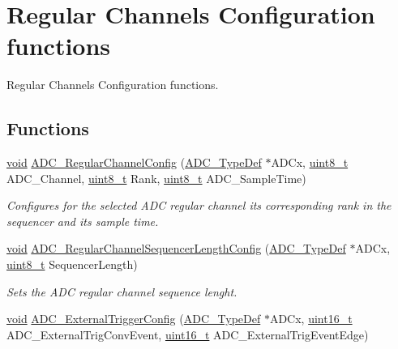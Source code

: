 \hypertarget{group___a_d_c___group4}{\section{Regular Channels Configuration functions}
\label{group___a_d_c___group4}
}


Regular Channels Configuration functions.  


\subsection*{Functions}
\begin{DoxyCompactItemize}
\item 
\hyperlink{group___n_a_m_e_ga18028b8badbf1ea7e704ccac3c488e82}{void} \hyperlink{group___a_d_c___group4_gac531adb577b648d4bb8881f2ed627d52}{A\-D\-C\-\_\-\-Regular\-Channel\-Config} (\hyperlink{struct_a_d_c___type_def}{A\-D\-C\-\_\-\-Type\-Def} $\ast$A\-D\-Cx, \hyperlink{stdint_8h_aba7bc1797add20fe3efdf37ced1182c5}{uint8\-\_\-t} A\-D\-C\-\_\-\-Channel, \hyperlink{stdint_8h_aba7bc1797add20fe3efdf37ced1182c5}{uint8\-\_\-t} Rank, \hyperlink{stdint_8h_aba7bc1797add20fe3efdf37ced1182c5}{uint8\-\_\-t} A\-D\-C\-\_\-\-Sample\-Time)
\begin{DoxyCompactList}\small\item\em Configures for the selected A\-D\-C regular channel its corresponding rank in the sequencer and its sample time. \end{DoxyCompactList}\item 
\hyperlink{group___n_a_m_e_ga18028b8badbf1ea7e704ccac3c488e82}{void} \hyperlink{group___a_d_c___group4_ga8d8707b4856b617fc709cf840467e5ad}{A\-D\-C\-\_\-\-Regular\-Channel\-Sequencer\-Length\-Config} (\hyperlink{struct_a_d_c___type_def}{A\-D\-C\-\_\-\-Type\-Def} $\ast$A\-D\-Cx, \hyperlink{stdint_8h_aba7bc1797add20fe3efdf37ced1182c5}{uint8\-\_\-t} Sequencer\-Length)
\begin{DoxyCompactList}\small\item\em Sets the A\-D\-C regular channel sequence lenght. \end{DoxyCompactList}\item 
\hyperlink{group___n_a_m_e_ga18028b8badbf1ea7e704ccac3c488e82}{void} \hyperlink{group___a_d_c___group4_ga1b5fdad6677d7f16b58641d9aced48a1}{A\-D\-C\-\_\-\-External\-Trigger\-Config} (\hyperlink{struct_a_d_c___type_def}{A\-D\-C\-\_\-\-Type\-Def} $\ast$A\-D\-Cx, \hyperlink{stdint_8h_a273cf69d639a59973b6019625df33e30}{uint16\-\_\-t} A\-D\-C\-\_\-\-External\-Trig\-Conv\-Event, \hyperlink{stdint_8h_a273cf69d639a59973b6019625df33e30}{uint16\-\_\-t} A\-D\-C\-\_\-\-External\-Trig\-Event\-Edge)

\end{DoxyCompactItemize}
